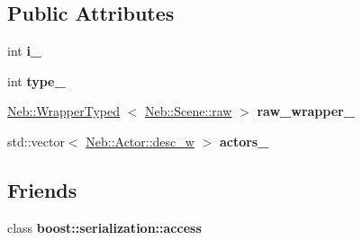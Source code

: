 \subsection*{\-Public \-Attributes}
\begin{DoxyCompactItemize}
\item 
\hypertarget{classNeb_1_1Scene_1_1desc_abff9f7925dd01db111ad5172d4203140}{int {\bfseries i\-\_\-}}\label{classNeb_1_1Scene_1_1desc_abff9f7925dd01db111ad5172d4203140}

\item 
\hypertarget{classNeb_1_1Scene_1_1desc_aec0d3c9d5e2e0fc5e4a5ac1a3cfcbe1a}{int {\bfseries type\-\_\-}}\label{classNeb_1_1Scene_1_1desc_aec0d3c9d5e2e0fc5e4a5ac1a3cfcbe1a}

\item 
\hypertarget{classNeb_1_1Scene_1_1desc_a0ca30e61e258583b92b5526cb71b2bc2}{\hyperlink{classNeb_1_1WrapperTyped}{\-Neb\-::\-Wrapper\-Typed}\*
$<$ \hyperlink{classNeb_1_1Scene_1_1raw}{\-Neb\-::\-Scene\-::raw} $>$ {\bfseries raw\-\_\-wrapper\-\_\-}}\label{classNeb_1_1Scene_1_1desc_a0ca30e61e258583b92b5526cb71b2bc2}

\item 
\hypertarget{classNeb_1_1Scene_1_1desc_a3aa7ffd041f085f055ac96cc21262ac5}{std\-::vector$<$ \hyperlink{classNeb_1_1weak__ptr}{\-Neb\-::\-Actor\-::desc\-\_\-w} $>$ {\bfseries actors\-\_\-}}\label{classNeb_1_1Scene_1_1desc_a3aa7ffd041f085f055ac96cc21262ac5}

\end{DoxyCompactItemize}
\subsection*{\-Friends}
\begin{DoxyCompactItemize}
\item 
\hypertarget{classNeb_1_1Scene_1_1desc_ac98d07dd8f7b70e16ccb9a01abf56b9c}{class {\bfseries boost\-::serialization\-::access}}\label{classNeb_1_1Scene_1_1desc_ac98d07dd8f7b70e16ccb9a01abf56b9c}

\end{DoxyCompactItemize}


